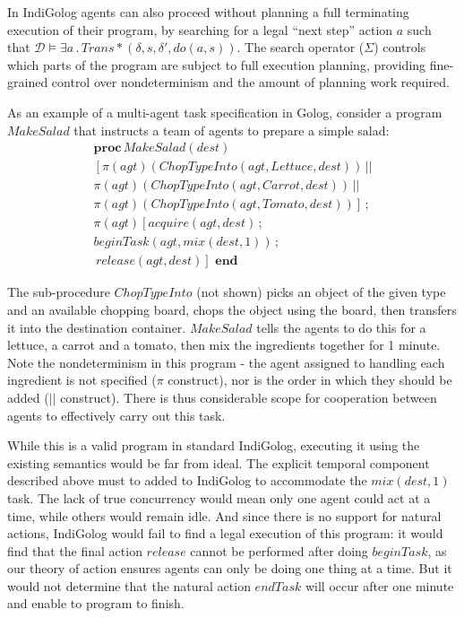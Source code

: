 \documentclass[times, 10pt, twocolumn]{article}
\begin{document}
In IndiGolog agents can also proceed without planning a full terminating
execution of their program, by searching for a legal {}``next step''
action $a$ such that $\mathcal{D}\models\exists a\,.\, Trans*(\delta,s,\delta',do(a,s))$.
The search operator ($\Sigma$) controls which parts of the program
are subject to full execution planning, providing fine-grained control
over nondeterminism and the amount of planning work required.

As an example of a multi-agent task specification in Golog, consider
a program $MakeSalad$ that instructs a team of agents to prepare
a simple salad:
\begin{multline}
\mathbf{proc}\, MakeSalad(dest)\label{eqn:MakeSalad}\\
\left[\pi(agt)(ChopTypeInto(agt,Lettuce,dest))\,||\right.\\
\pi(agt)(ChopTypeInto(agt,Carrot,dest))\,||\\
\left.\pi(agt)(ChopTypeInto(agt,Tomato,dest))\right]\,;\\
\pi(agt)\left[acquire(agt,dest)\,;\,\right.\\
beginTask(agt,mix(dest,1))\,;\\
\left.\, release(agt,dest)\right]\,\,\mathbf{end}\end{multline}

The sub-procedure $ChopTypeInto$ (not shown) picks an object of
the given type and an available chopping board, chops the object using
the board, then transfers it into the destination container. $MakeSalad$
tells the agents to do this for a lettuce, a carrot and a tomato,
then mix the ingredients together for 1 minute. Note the nondeterminism
in this program - the agent assigned to handling each ingredient is
not specified ($\pi$ construct), nor is the order in which they should
be added ($||$ construct). There is thus considerable scope for cooperation
between agents to effectively carry out this task.

While this is a valid program in standard IndiGolog, executing it
using the existing semantics would be far from ideal. The explicit
temporal component described above must to added to IndiGolog to accommodate
the $mix(dest,1)$ task. The lack of true concurrency would mean only
one agent could act at a time, while others would remain idle. And
since there is no support for natural actions, IndiGolog would fail
to find a legal execution of this program: it would find that the
final action $release$ cannot be performed after doing $beginTask$,
as our theory of action ensures agents can only be doing one thing
at a time. But it would not determine that the natural action $endTask$
will occur after one minute and enable to program to finish.
\end{document}

